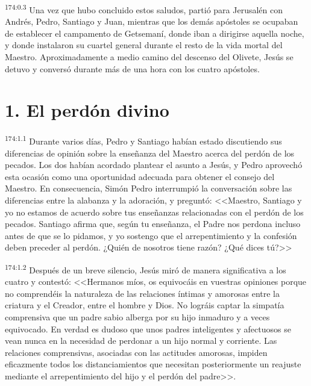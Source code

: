 \par 
\textsuperscript{174:0.3} Una vez que hubo concluido estos saludos, partió para Jerusalén con Andrés, Pedro, Santiago y Juan, mientras que los demás apóstoles se ocupaban de establecer el campamento de Getsemaní, donde iban a dirigirse aquella noche, y donde instalaron su cuartel general durante el resto de la vida mortal del Maestro. Aproximadamente a medio camino del descenso del Olivete, Jesús se detuvo y conversó durante más de una hora con los cuatro apóstoles.

\section*{1. El perdón divino}
\par 
\textsuperscript{174:1.1} Durante varios días, Pedro y Santiago habían estado discutiendo sus diferencias de opinión sobre la enseñanza del Maestro acerca del perdón de los pecados. Los dos habían acordado plantear el asunto a Jesús, y Pedro aprovechó esta ocasión como una oportunidad adecuada para obtener el consejo del Maestro. En consecuencia, Simón Pedro interrumpió la conversación sobre las diferencias entre la alabanza y la adoración, y preguntó: <<Maestro, Santiago y yo no estamos de acuerdo sobre tus enseñanzas relacionadas con el perdón de los pecados. Santiago afirma que, según tu enseñanza, el Padre nos perdona incluso antes de que se lo pidamos, y yo sostengo que el arrepentimiento y la confesión deben preceder al perdón. ¿Quién de nosotros tiene razón? ¿Qué dices tú?>>

\par 
\textsuperscript{174:1.2} Después de un breve silencio, Jesús miró de manera significativa a los cuatro y contestó: <<Hermanos míos, os equivocáis en vuestras opiniones porque no comprendéis la naturaleza de las relaciones íntimas y amorosas entre la criatura y el Creador, entre el hombre y Dios. No lográis captar la simpatía comprensiva que un padre sabio alberga por su hijo inmaduro y a veces equivocado. En verdad es dudoso que unos padres inteligentes y afectuosos se vean nunca en la necesidad de perdonar a un hijo normal y corriente. Las relaciones comprensivas, asociadas con las actitudes amorosas, impiden eficazmente todos los distanciamientos que necesitan posteriormente un reajuste mediante el arrepentimiento del hijo y el perdón del padre>>.

